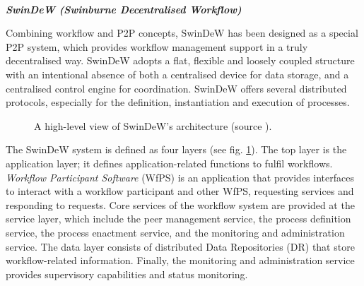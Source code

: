 ~

\noindent\textbf{\textit{SwinDeW (Swinburne Decentralised Workflow) \cite{junYan06}}}

Combining workflow and P2P concepts, SwinDeW \cite{junYan06} has been designed as a special P2P system, which provides workflow management support in a truly decentralised way. SwinDeW adopts a flat, flexible and loosely coupled structure with an intentional absence of both a centralised device for data storage, and a centralised control engine for coordination. SwinDeW offers several distributed protocols, especially for the definition, instantiation and execution of processes.
\begin{figure}[ht!]
	\noindent
	\caption{A high-level view of SwinDeW's architecture (source \cite{junYan06}).}
	\label{chap1:fig:swindew}
\end{figure}

The SwinDeW system is defined as four layers (see fig. \ref{chap1:fig:swindew}). The top layer is the application layer; it defines application-related functions to fulfil workflows. \textit{Workflow Participant Software} (WfPS) is an application that provides interfaces to interact with a workflow participant and other WfPS, requesting services and responding to requests. Core services of the workflow system are provided at the service layer, which include the peer management service, the process definition service, the process enactment service, and the monitoring and administration service. The data layer consists of distributed Data Repositories (DR) that store workflow-related information. Finally, the monitoring and administration service provides supervisory capabilities and status monitoring.

